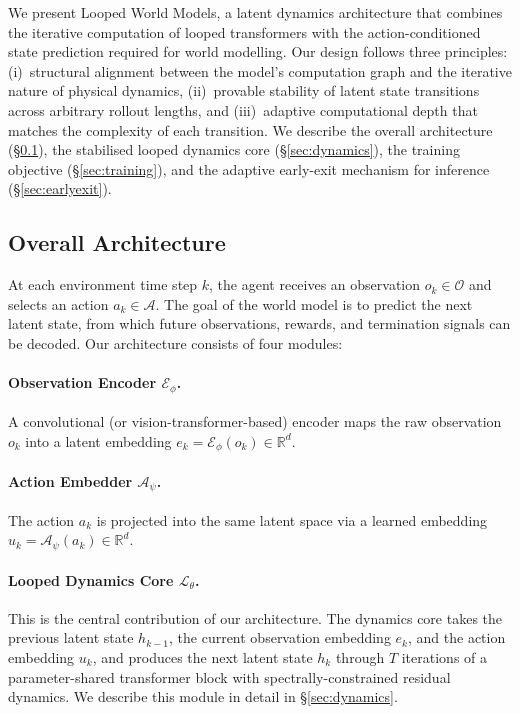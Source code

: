 We present Looped World Models, a latent dynamics architecture that combines the iterative computation of looped transformers with the action-conditioned state prediction required for world modelling. Our design follows three principles: (i)~structural alignment between the model's computation graph and the iterative nature of physical dynamics, (ii)~provable stability of latent state transitions across arbitrary rollout lengths, and (iii)~adaptive computational depth that matches the complexity of each transition. We describe the overall architecture (\S\ref{sec:architecture}), the stabilised looped dynamics core (\S\ref{sec:dynamics}), the training objective (\S\ref{sec:training}), and the adaptive early-exit mechanism for inference (\S\ref{sec:earlyexit}).

\subsection{Overall Architecture}
\label{sec:architecture}

At each environment time step $k$, the agent receives an observation $o_k \in \mathcal{O}$ and selects an action $a_k \in \mathcal{A}$. The goal of the world model is to predict the next latent state, from which future observations, rewards, and termination signals can be decoded. Our architecture consists of four modules:

\paragraph{Observation Encoder $\mathcal{E}_\phi$.} A convolutional (or vision-transformer-based) encoder maps the raw observation $o_k$ into a latent embedding $e_k = \mathcal{E}_\phi(o_k) \in \mathbb{R}^{d}$.

\paragraph{Action Embedder $\mathcal{A}_\psi$.} The action $a_k$ is projected into the same latent space via a learned embedding $u_k = \mathcal{A}_\psi(a_k) \in \mathbb{R}^{d}$.

\paragraph{Looped Dynamics Core $\mathcal{L}_\theta$.} This is the central contribution of our architecture. The dynamics core takes the previous latent state $h_{k-1}$, the current observation embedding $e_k$, and the action embedding $u_k$, and produces the next latent state $h_k$ through $T$ iterations of a parameter-shared transformer block with spectrally-constrained residual dynamics. We describe this module in detail in \S\ref{sec:dynamics}.

